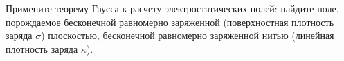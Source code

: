 \documentclass[__main__.tex]{subfiles}
\begin{document}
Примените теорему Гаусса к расчету электростатических полей: найдите поле, порождаемое бесконечной равномерно заряженной (поверхностная плотность заряда $\sigma$) плоскостью, бесконечной равномерно заряженной нитью (линейная плотность заряда $\kappa$).\\ 

\end{document}
